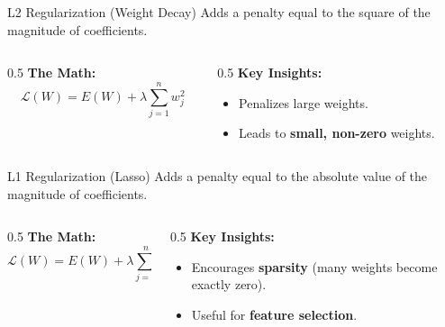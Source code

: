 \documentclass[aspectratio=169]{beamer}
\begin{document}
\begin{frame}{L2 Regularization (Weight Decay)}
	Adds a penalty equal to the square of the magnitude of coefficients.
	\vspace{0.3cm}
	\begin{columns}
		\begin{column}{0.5\textwidth}
			\textbf{The Math:}
			$$\mathcal{L}(W) = E(W) + \lambda \sum_{j=1}^{n} w_j^2$$
		\end{column}
		\begin{column}{0.5\textwidth}
			\textbf{Key Insights:}
			\begin{itemize}
				\item Penalizes large weights.
				\item Leads to \textbf{small, non-zero} weights.
			\end{itemize}
		\end{column}
	\end{columns}
\end{frame}

\begin{frame}{L1 Regularization (Lasso)}
	Adds a penalty equal to the absolute value of the magnitude of coefficients.
	\vspace{0.3cm}
	\begin{columns}
		\begin{column}{0.5\textwidth}
			\textbf{The Math:}
			$$\mathcal{L}(W) = E(W) + \lambda \sum_{j=1}^{n} |w_j|$$
		\end{column}
		\begin{column}{0.5\textwidth}
			\textbf{Key Insights:}
			\begin{itemize}
				\item Encourages \textbf{sparsity} (many weights become exactly zero).
				\item Useful for \textbf{feature selection}.
			\end{itemize}
		\end{column}
	\end{columns}
\end{frame}
\end{document}
